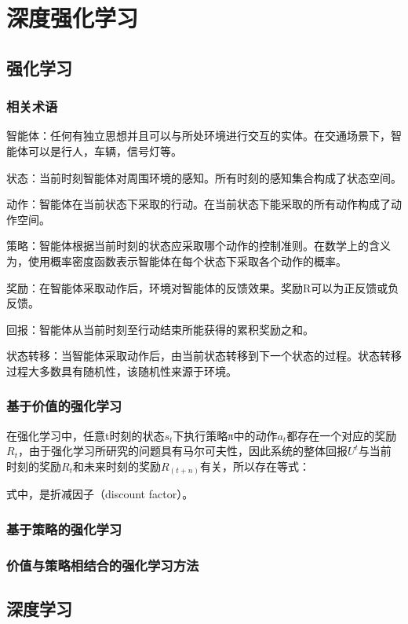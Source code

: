 \chapter{深度强化学习}
\label{chp:initialization}

\section{强化学习}
\subsection{相关术语}
智能体：任何有独立思想并且可以与所处环境进行交互的实体。在交通场景下，智能体可以是行人，车辆，信号灯等。

状态：当前时刻智能体对周围环境的感知。所有时刻的感知集合构成了状态空间。

动作：智能体在当前状态下采取的行动。在当前状态下能采取的所有动作构成了动作空间。

策略：智能体根据当前时刻的状态应采取哪个动作的控制准则。在数学上的含义为，使用概率密度函数表示智能体在每个状态下采取各个动作的概率。

奖励：在智能体采取动作后，环境对智能体的反馈效果。奖励R可以为正反馈或负反馈。

回报：智能体从当前时刻至行动结束所能获得的累积奖励之和。

状态转移：当智能体采取动作后，由当前状态转移到下一个状态的过程。状态转移过程大多数具有随机性，该随机性来源于环境。
\subsection{基于价值的强化学习}

在强化学习中，任意t时刻的状态$s_t$下执行策略π中的动作$a_t$都存在一个对应的奖励$R_t$，由于强化学习所研究的问题具有马尔可夫性，因此系统的整体回报$U^t$与当前时刻的奖励$R_t$和未来时刻的奖励$R_(t+n)$有关，所以存在等式：

式中，是折减因子（discount factor）。

\subsection{基于策略的强化学习}

\subsection{价值与策略相结合的强化学习方法}

\section{深度学习}

